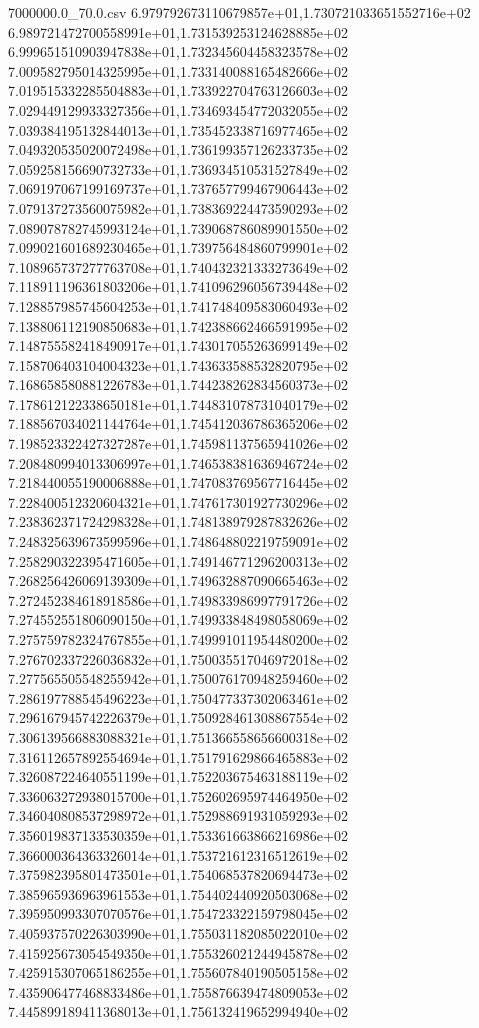 \begin{filecontents*}{7000000.0_70.0.csv}
6.979792673110679857e+01,1.730721033651552716e+02
6.989721472700558991e+01,1.731539253124628885e+02
6.999651510903947838e+01,1.732345604458323578e+02
7.009582795014325995e+01,1.733140088165482666e+02
7.019515332285504883e+01,1.733922704763126603e+02
7.029449129933327356e+01,1.734693454772032055e+02
7.039384195132844013e+01,1.735452338716977465e+02
7.049320535020072498e+01,1.736199357126233735e+02
7.059258156690732733e+01,1.736934510531527849e+02
7.069197067199169737e+01,1.737657799467906443e+02
7.079137273560075982e+01,1.738369224473590293e+02
7.089078782745993124e+01,1.739068786089901550e+02
7.099021601689230465e+01,1.739756484860799901e+02
7.108965737277763708e+01,1.740432321333273649e+02
7.118911196361803206e+01,1.741096296056739448e+02
7.128857985745604253e+01,1.741748409583060493e+02
7.138806112190850683e+01,1.742388662466591995e+02
7.148755582418490917e+01,1.743017055263699149e+02
7.158706403104004323e+01,1.743633588532820795e+02
7.168658580881226783e+01,1.744238262834560373e+02
7.178612122338650181e+01,1.744831078731040179e+02
7.188567034021144764e+01,1.745412036786365206e+02
7.198523322427327287e+01,1.745981137565941026e+02
7.208480994013306997e+01,1.746538381636946724e+02
7.218440055190006888e+01,1.747083769567716445e+02
7.228400512320604321e+01,1.747617301927730296e+02
7.238362371724298328e+01,1.748138979287832626e+02
7.248325639673599596e+01,1.748648802219759091e+02
7.258290322395471605e+01,1.749146771296200313e+02
7.268256426069139309e+01,1.749632887090665463e+02
7.272452384618918586e+01,1.749833986997791726e+02
7.274552551806090150e+01,1.749933848498058069e+02
7.275759782324767855e+01,1.749991011954480200e+02
7.276702337226036832e+01,1.750035517046972018e+02
7.277565505548255942e+01,1.750076170948259460e+02
7.286197788545496223e+01,1.750477337302063461e+02
7.296167945742226379e+01,1.750928461308867554e+02
7.306139566883088321e+01,1.751366558656600318e+02
7.316112657892554694e+01,1.751791629866465883e+02
7.326087224640551199e+01,1.752203675463188119e+02
7.336063272938015700e+01,1.752602695974464950e+02
7.346040808537298972e+01,1.752988691931059293e+02
7.356019837133530359e+01,1.753361663866216986e+02
7.366000364363326014e+01,1.753721612316512619e+02
7.375982395801473501e+01,1.754068537820694473e+02
7.385965936963961553e+01,1.754402440920503068e+02
7.395950993307070576e+01,1.754723322159798045e+02
7.405937570226303990e+01,1.755031182085022010e+02
7.415925673054549350e+01,1.755326021244945878e+02
7.425915307065186255e+01,1.755607840190505158e+02
7.435906477468833486e+01,1.755876639474809053e+02
7.445899189411368013e+01,1.756132419652994940e+02

\end{filecontents*}
